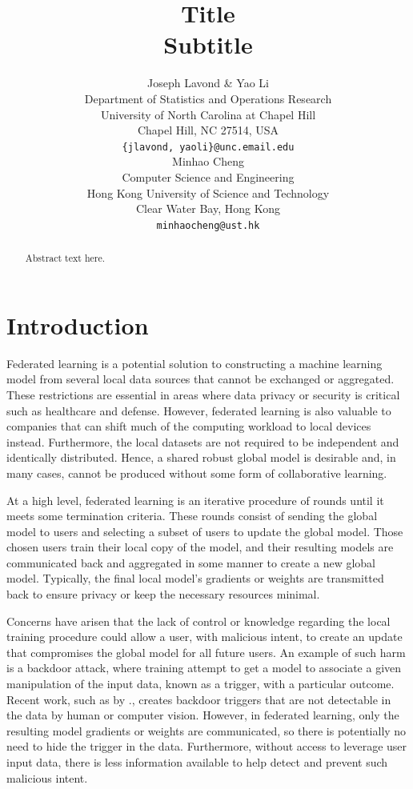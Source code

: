 \documentclass{article} %
\title{Title \\ Subtitle}
\author{%
    Joseph Lavond \& Yao Li  \\
    Department of Statistics and Operations Research \\
    University of North Carolina at Chapel Hill \\
    Chapel Hill, NC 27514, USA \\
    \texttt{\{jlavond, yaoli\}@unc.email.edu} \\
    \And
    Minhao Cheng \\
    Computer Science and Engineering \\
    Hong Kong University of Science and Technology \\
    Clear Water Bay, Hong Kong \\
    \texttt{minhaocheng@ust.hk}
}
\begin{document}
\maketitle

\begin{abstract}
Abstract text here.
\end{abstract}



\section{Introduction}

Federated learning is a potential solution to constructing a machine learning model from several local data sources that cannot be exchanged or aggregated. These restrictions are essential in areas where data privacy or security is critical such as healthcare and defense. However, federated learning is also valuable to companies that can shift much of the computing workload to local devices instead. Furthermore, the local datasets are not required to be independent and identically distributed. Hence, a shared robust global model is desirable and, in many cases, cannot be produced without some form of collaborative learning.

At a high level, federated learning is an iterative procedure of rounds until it meets some termination criteria. These rounds consist of sending the global model to users and selecting a subset of users to update the global model. Those chosen users train their local copy of the model, and their resulting models are communicated back and aggregated in some manner to create a new global model. Typically, the final local model's gradients or weights are transmitted back to ensure privacy or keep the necessary resources minimal. 

Concerns have arisen that the lack of control or knowledge regarding the local training procedure could allow a user, with malicious intent, to create an update that compromises the global model for all future users. An example of such harm is a backdoor attack, where training attempt to get a model to associate a given manipulation of the input data, known as a trigger, with a particular outcome. Recent work, such as by \cite{stamp-invisible}., creates backdoor triggers that are not detectable in the data by human or computer vision. However, in federated learning, only the resulting model gradients or weights are communicated, so there is potentially no need to hide the trigger in the data. Furthermore, without access to leverage user input data, there is less information available to help detect and prevent such malicious intent.
\end{document}
